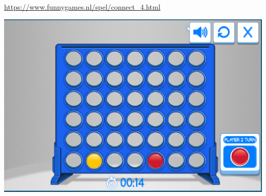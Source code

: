 \documentclass{article}
\begin{document}
     \url{https://www.funnygames.nl/spel/connect_4.html}
     
     \includegraphics[width=\linewidth]{2}
\end{document}

